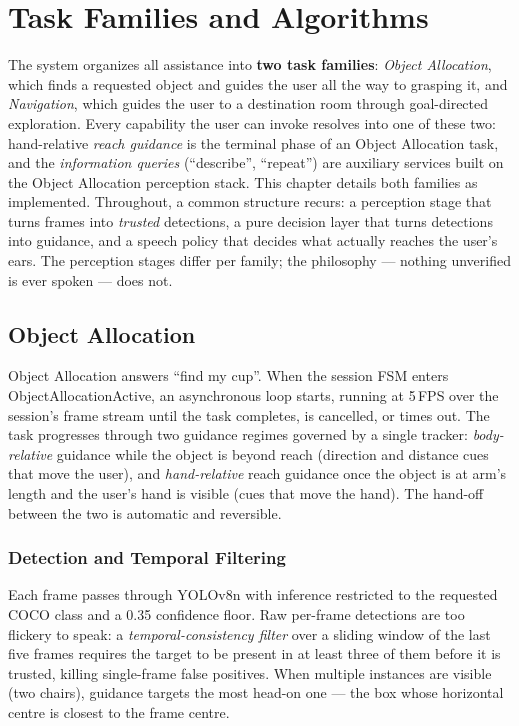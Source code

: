 \chapter{Task Families and Algorithms}
\label{ch:task_families}

The system organizes all assistance into \textbf{two task families}:
\emph{Object Allocation}, which finds a requested object and guides the user all
the way to grasping it, and \emph{Navigation}, which guides the user to a
destination room through goal-directed exploration. Every capability the user can
invoke resolves into one of these two: hand-relative \emph{reach guidance} is the
terminal phase of an Object Allocation task, and the \emph{information queries}
(``describe'', ``repeat'') are auxiliary services built on the Object Allocation
perception stack. This chapter details both families as implemented. Throughout, a
common structure recurs: a perception stage that turns frames into \emph{trusted}
detections, a pure decision layer that turns detections into guidance, and a speech
policy that decides what actually reaches the user's ears. The perception stages
differ per family; the philosophy --- nothing unverified is ever spoken --- does
not.

\section{Object Allocation}
\label{sec:object_allocation}

Object Allocation answers ``find my cup''. When the session FSM enters
ObjectAllocationActive, an asynchronous loop starts, running at 5\,FPS over the
session's frame stream until the task completes, is cancelled, or times out. The
task progresses through two guidance regimes governed by a single tracker:
\emph{body-relative} guidance while the object is beyond reach (direction and
distance cues that move the user), and \emph{hand-relative} reach guidance once the
object is at arm's length and the user's hand is visible (cues that move the hand).
The hand-off between the two is automatic and reversible.

\subsection{Detection and Temporal Filtering}

Each frame passes through YOLOv8n with inference restricted to the requested COCO
class and a 0.35 confidence floor. Raw per-frame detections are too flickery to
speak: a \emph{temporal-consistency filter} over a sliding window of the last five
frames requires the target to be present in at least three of them before it is
trusted, killing single-frame false positives. When multiple instances are visible
(two chairs), guidance targets the most head-on one --- the box whose horizontal
centre is closest to the frame centre.

